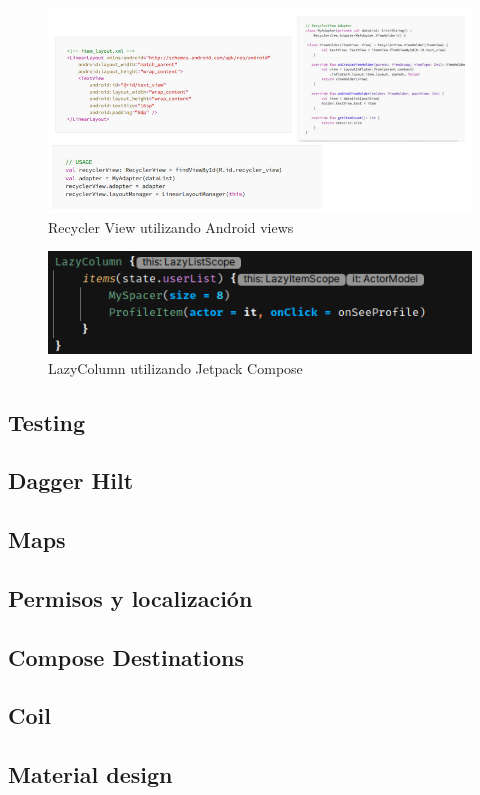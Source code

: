 \begin{figure}[h]
	\centering
	\includegraphics[width = 1\textwidth]{Imagenes/Fuentes/views_demo.png}
	\caption{Recycler View utilizando Android views \citep{RecyclerVsLazy}}
	\label{fig:views_demo}
\end{figure}
\begin{figure}[h]
	\centering
	\includegraphics[width = 1\textwidth]{Imagenes/Fuentes/compose_demo.png}
	\caption{LazyColumn utilizando Jetpack Compose}
	\label{fig:compose_demo}
\end{figure}

\subsection{Testing}

\subsection{Dagger Hilt}

\subsection{Maps}

\subsection{Permisos y localización}

\subsection{Compose Destinations}

\subsection{Coil}

\subsection{Material design}
\label{subsec:material_design}
